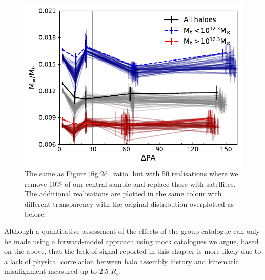 \begin{figure}
    \centering
	\includegraphics[width=0.7\linewidth]{thesis/latex/halo_assembly_manga/halo_ratio_wsampling.pdf}
    \caption[The same as Figure \ref{fig:2d_ratio} but with 50 realisations where we remove 10\% of our central sample and replace these with satellites]{The same as Figure \ref{fig:2d_ratio} but with 50 realisations where we remove 10\% of our central sample and replace these with satellites. The additional realisations are plotted in the same colour with different transparency with the original distribution overplotted as before. }
    \label{fig:2d_ratio_realisations}
\end{figure}

Although a quantitative assessment of the effects of the group catalogue can only be made using a forward-model approach using mock catalogues we argue, based on the above, that the lack of signal reported in this chapter is more likely due to a lack of physical correlation between halo assembly history and kinematic misalignment measured up to 2.5 $R_e$.

